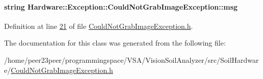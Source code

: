 \paragraph[{msg}]{\setlength{\rightskip}{0pt plus 5cm}string Hardware\+::\+Exception\+::\+Could\+Not\+Grab\+Image\+Exception\+::msg\hspace{0.3cm}{\ttfamily [private]}}\label{class_hardware_1_1_exception_1_1_could_not_grab_image_exception_a3fe61759aec4ce332a968f49ced6b12a}


Definition at line \hyperlink{_could_not_grab_image_exception_8h_source_l00021}{21} of file \hyperlink{_could_not_grab_image_exception_8h_source}{Could\+Not\+Grab\+Image\+Exception.\+h}.



The documentation for this class was generated from the following file\+:\begin{DoxyCompactItemize}
\item 
/home/peer23peer/programmingspace/\+V\+S\+A/\+Vision\+Soil\+Analyzer/src/\+Soil\+Hardware/\hyperlink{_could_not_grab_image_exception_8h}{Could\+Not\+Grab\+Image\+Exception.\+h}\end{DoxyCompactItemize}
